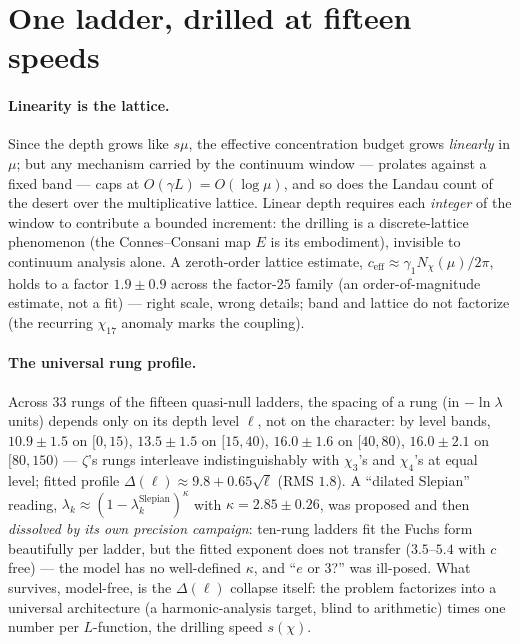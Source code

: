 \documentclass[10pt]{article}
\begin{document}
\section{One ladder, drilled at fifteen speeds}

\paragraph{Linearity is the lattice.} Since the depth grows like
$s\mu$, the effective concentration budget grows \emph{linearly} in
$\mu$; but any mechanism carried by the continuum window --- prolates
against a fixed band --- caps at $O(\gamma L)=O(\log\mu)$, and so does
the Landau count of the desert over the multiplicative lattice. Linear
depth requires each \emph{integer} of the window to contribute a bounded
increment: the drilling is a discrete-lattice phenomenon (the
Connes--Consani map $E$ is its embodiment), invisible to continuum
analysis alone. A zeroth-order lattice estimate,
$c_{\mathrm{eff}}\approx\gamma_1 N_\chi(\mu)/2\pi$, holds to a factor
$1.9\pm0.9$ across the factor-$25$ family (an order-of-magnitude
estimate, not a fit) --- right scale, wrong details; band and lattice do not factorize (the recurring $\chi_{17}$
anomaly marks the coupling).

\paragraph{The universal rung profile.} Across $33$ rungs of the fifteen
quasi-null ladders, the spacing of a rung (in $-\ln\lambda$ units)
depends only on its depth level $\ell$, not on the character: by level
bands, $10.9\pm1.5$ on $[0,15)$, $13.5\pm1.5$ on $[15,40)$,
$16.0\pm1.6$ on $[40,80)$, $16.0\pm2.1$ on $[80,150)$ --- $\zeta$'s
rungs interleave indistinguishably with $\chi_3$'s and $\chi_4$'s at
equal level; fitted profile $\Delta(\ell)\approx9.8+0.65\sqrt\ell$ (RMS
$1.8$). A ``dilated Slepian'' reading, $\lambda_k\approx
(1-\lambda_k^{\mathrm{Slepian}})^\kappa$ with $\kappa=2.85\pm0.26$, was
proposed and then \emph{dissolved by its own precision campaign}:
ten-rung ladders fit the Fuchs form beautifully per ladder, but the
fitted exponent does not transfer ($3.5$--$5.4$ with $c$ free) --- the
model has no well-defined $\kappa$, and ``$e$ or $3$?'' was ill-posed.
What survives, model-free, is the $\Delta(\ell)$ collapse itself: the
problem factorizes into a universal architecture (a harmonic-analysis
target, blind to arithmetic) times one number per $L$-function, the
drilling speed $s(\chi)$.
\end{document}
